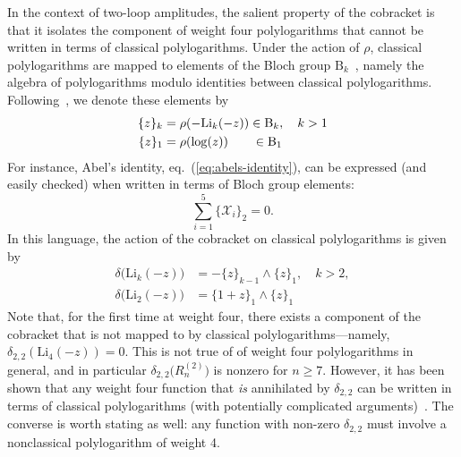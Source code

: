 \documentclass[12pt]{article}
\def\x{\mathcal{X}}
\begin{document}
In the context of two-loop amplitudes, the salient property of the cobracket is that it isolates the component of weight four polylogarithms that cannot be written in terms of classical polylogarithms. Under the action of $\rho$, classical polylogarithms are mapped to elements of the Bloch group $\text{B}_k$~\cite{Bloch:2000, Suslin:1990}, namely the algebra of polylogarithms modulo identities between classical polylogarithms. Following~\cite{Golden:2013xva}, we denote these elements by
\begin{align}
 \{ z \}_k  &= \rho(-\text{Li}_k(-z)) \in \text{B}_k, \quad k>1 \\
 \{ z \}_1  &= \rho(\log(z)) \hspace{.675cm} \in \text{B}_1
\end{align}
For instance, Abel's identity, eq.~(\ref{eq:abels-identity}), can be expressed (and easily checked) when written in terms of Bloch group elements:
\begin{equation}
	\sum_{i=1}^5 \{\x_i\}_2 = 0.
\end{equation}
In this language, the action of the cobracket on classical polylogarithms is given by
\begin{align}
\delta \big( \text{Li}_k(-z) \big) &= - \{ z \}_{k-1} \wedge \{ z \}_1 , \quad k>2 , \\
\delta \big( \text{Li}_2(-z) \big) &= \{ 1 + z \}_{1} \wedge \{ z \}_1
\end{align}
Note that, for the first time at weight four, there exists a component of the cobracket that is not mapped to by classical polylogarithms---namely, $\delta_{2,2}(\text{Li}_4(-z))=0$. This is not true of of weight four polylogarithms in general, and in particular $\delta_{2,2} \big(R_n^{(2)} \big)$ is nonzero for $n\ge7$. However, it has been shown that any weight four function that \emph{is} annihilated by $\delta_{2,2}$ can be written in terms of classical polylogarithms (with potentially complicated arguments)~\cite{G91a}. The converse is worth stating as well: any function with non-zero $\delta_{2,2}$ must involve a nonclassical polylogarithm of weight 4. 
\end{document}
